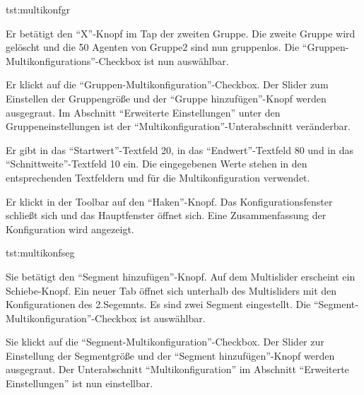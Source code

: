 \documentclass[parskip=full,11pt]{scrartcl}
\begin{document}
{tst:multikonfgr}

{Er betätigt den \enquote{X}-Knopf im Tap der zweiten Gruppe.}
{Die zweite Gruppe wird gelöscht und die 50 Agenten von Gruppe2 sind nun gruppenlos. Die \enquote{Gruppen-Multikonfigurations}-Checkbox ist nun auswählbar.}

{Er klickt auf die \enquote{Gruppen-Multikonfiguration}-Checkbox.}
{Der Slider zum Einstellen der Gruppengröße und der \enquote{Gruppe hinzufügen}-Knopf werden ausgegraut. Im Abschnitt \enquote{Erweiterte Einstellungen} unter den Gruppeneinstellungen ist der \enquote{Multikonfiguration}-Unterabschnitt veränderbar.}

{Er gibt in das \enquote{Startwert}-Textfeld 20, in das \enquote{Endwert}-Textfeld 80 und in das \enquote{Schnittweite}-Textfeld 10 ein.}
{Die eingegebenen Werte stehen in den entsprechenden Textfeldern und für die Multikonfiguration verwendet.}

{Er klickt in der Toolbar auf den \enquote{Haken}-Knopf.}
{Das Konfigurationsfenster schließt sich und das Hauptfenster öffnet sich. Eine Zusammenfassung der Konfiguration wird angezeigt.}

{tst:multikonfseg}

{Sie betätigt den \enquote{Segment hinzufügen}-Knopf.}
{Auf dem Multislider erscheint ein Schiebe-Knopf. Ein neuer Tab öffnet sich unterhalb des Multisliders mit den Konfigurationen des 2.Segemnts. Es sind zwei Segment eingestellt. Die \enquote{Segment-Multikonfiguration}-Checkbox ist auswählbar.}

{Sie klickt auf die \enquote{Segment-Multikonfiguration}-Checkbox.}
{Der Slider zur Einstellung der Segmentgröße und der \enquote{Segment hinzufügen}-Knopf werden ausgegraut. Der Unterabschnitt \enquote{Multikonfiguration} im Abschnitt \enquote{Erweiterte Einstellungen} ist nun einstellbar.}
\end{document}

